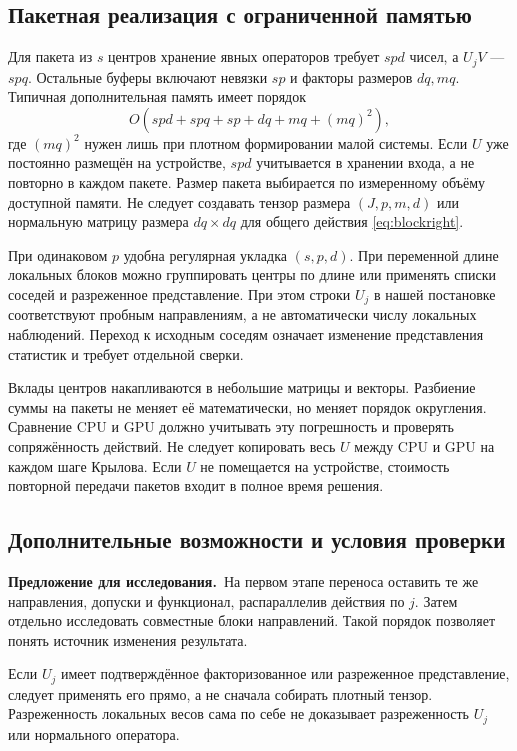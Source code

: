 \documentclass[11pt,a4paper]{article}
\numberwithin{equation}{section}
\theoremstyle{remark}
\newcommand{\proposal}{\par\noindent\textbf{Предложение для исследования.}\ }
\begin{document}
\subsection{Пакетная реализация с ограниченной памятью}
Для пакета из $s$ центров хранение явных операторов требует $spd$ чисел,
а $U_jV$ --- $spq$. Остальные буферы включают невязки $sp$ и факторы
размеров $dq,mq$. Типичная дополнительная память имеет порядок
\begin{equation}\label{eq:gpumemory}
 O(spd+spq+sp+dq+mq+(mq)^2),
\end{equation}
где $(mq)^2$ нужен лишь при плотном формировании малой системы.
Если $U$ уже постоянно размещён на устройстве, $spd$ учитывается в
хранении входа, а не повторно в каждом пакете.
Размер пакета выбирается по измеренному объёму доступной памяти.
Не следует создавать тензор размера $(J,p,m,d)$ или нормальную матрицу
размера $dq\times dq$ для общего действия \eqref{eq:blockright}.

При одинаковом $p$ удобна регулярная укладка $(s,p,d)$.
При переменной длине локальных блоков можно группировать центры по длине
или применять списки соседей и разреженное представление. При этом строки
$U_j$ в нашей постановке соответствуют пробным направлениям, а не
автоматически числу локальных наблюдений. Переход к исходным соседям
означает изменение представления статистик и требует отдельной сверки.

Вклады центров накапливаются в небольшие матрицы и векторы. Разбиение суммы
на пакеты не меняет её математически, но меняет порядок округления.
Сравнение CPU и GPU должно учитывать эту погрешность и проверять
сопряжённость действий. Не следует копировать весь $U$ между CPU и GPU
на каждом шаге Крылова. Если $U$ не помещается на устройстве, стоимость
повторной передачи пакетов входит в полное время решения.

\subsection{Дополнительные возможности и условия проверки}
\proposal На первом этапе переноса оставить те же направления, допуски
и функционал, распараллелив действия по $j$. Затем отдельно исследовать
совместные блоки направлений. Такой порядок позволяет понять источник
изменения результата.

Если $U_j$ имеет подтверждённое факторизованное или разреженное
представление, следует применять его прямо, а не сначала собирать плотный
тензор. Разреженность локальных весов сама по себе не доказывает
разреженность $U_j$ или нормального оператора.
\end{document}
